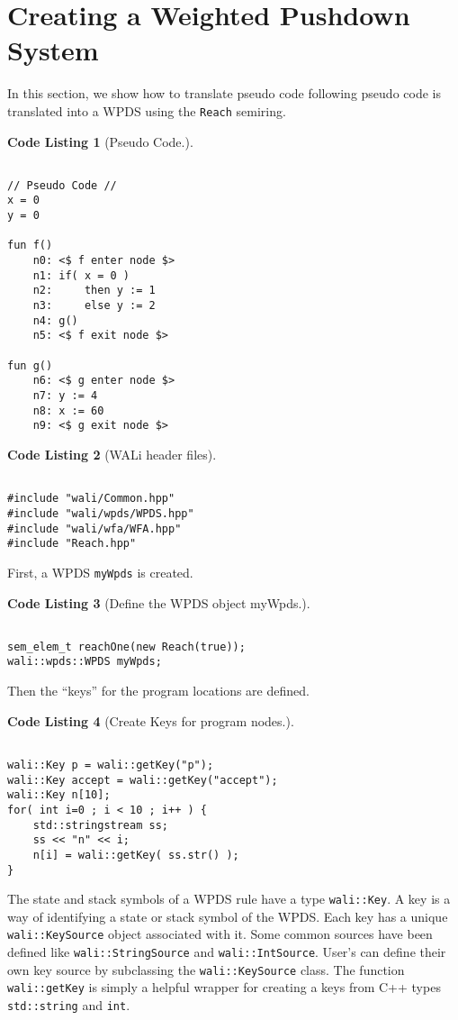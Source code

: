 \documentclass[english,a4paper,11pt]{article}
\theoremstyle{definition}
\newtheorem{codelist}{Code Listing}[section]
\begin{document}
\section{Creating a Weighted Pushdown System}
In this section, we show how to translate pseudo code 
following pseudo code is translated
into a WPDS using the \verb!Reach! semiring.
\begin{codelist}[Pseudo Code.]
\label{Fi:PseudoCode}
\begin{lstlisting}

// Pseudo Code //
x = 0
y = 0

fun f()
    n0: <$ f enter node $>
    n1: if( x = 0 )
    n2:     then y := 1
    n3:     else y := 2
    n4: g()
    n5: <$ f exit node $>

fun g()
    n6: <$ g enter node $>
    n7: y := 4
    n8: x := 60
    n9: <$ g exit node $>
\end{lstlisting}
\end{codelist}

\begin{codelist}[WALi header files]
\label{ExReach}
\begin{lstlisting}

#include "wali/Common.hpp"
#include "wali/wpds/WPDS.hpp"
#include "wali/wfa/WFA.hpp"
#include "Reach.hpp"
\end{lstlisting}
\end{codelist}

First, a WPDS \verb!myWpds! is created. 
\begin{codelist}[Define the WPDS object myWpds.]
\label{myWpds}
\begin{lstlisting}

sem_elem_t reachOne(new Reach(true));
wali::wpds::WPDS myWpds;
\end{lstlisting}
\end{codelist}

Then the ``keys'' for the program locations are defined.
\begin{codelist}[Create Keys for program nodes.]
\label{Keys}
\begin{lstlisting}

wali::Key p = wali::getKey("p");
wali::Key accept = wali::getKey("accept");
wali::Key n[10];
for( int i=0 ; i < 10 ; i++ ) {
    std::stringstream ss;
    ss << "n" << i;
    n[i] = wali::getKey( ss.str() );
}
\end{lstlisting}
\end{codelist}
The state and stack symbols of a WPDS rule have a type \verb!wali::Key!. A key
is a way of identifying a state or stack symbol of the WPDS. Each key has a
unique \verb!wali::KeySource! object associated with it. Some common sources
have been defined like \verb!wali::StringSource! and \verb!wali::IntSource!.
User's can define their own key source by subclassing the
\verb!wali::KeySource! class. The function \verb!wali::getKey! is simply a
helpful wrapper for creating a keys from C++ types \verb!std::string! and
\verb!int!. 
\end{document}

